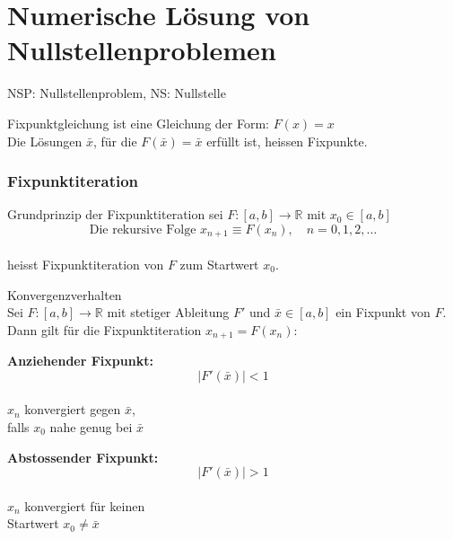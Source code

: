 \section{Numerische Lösung von Nullstellenproblemen}

\begin{remark}
    NSP: Nullstellenproblem, NS: Nullstelle
\end{remark}

\begin{definition}{Fixpunktgleichung}
ist eine Gleichung der Form: $F(x)=x$\\
Die Lösungen $\bar{x}$, für die $F(\bar{x})=\bar{x}$ erfüllt ist, heissen Fixpunkte.
\end{definition}

\subsubsection{Fixpunktiteration}

\begin{concept}{Grundprinzip der Fixpunktiteration}
sei $F:[a,b] \rightarrow \mathbb{R}$ mit $x_0 \in [a,b]$ 
\vspace{-6mm}\\
$$\text{Die rekursive Folge }x_{n+1} \equiv F(x_n), \quad n=0,1,2,\ldots$$
\vspace{-4mm}\\
heisst Fixpunktiteration von $F$ zum Startwert $x_0$.
\end{concept}

\begin{theorem}{Konvergenzverhalten}\\
Sei $F:[a,b] \rightarrow \mathbb{R}$ mit stetiger Ableitung $F'$ und $\bar{x} \in [a,b]$ ein Fixpunkt von $F$. Dann gilt für die Fixpunktiteration $x_{n+1}=F(x_n)$:
\vspace{1mm}\\
\begin{minipage}[t]{0.45\textwidth}
    \textbf{Anziehender Fixpunkt:}
    \vspace{-3mm}\\
    $$|F'(\bar{x})| < 1$$
    \vspace{-4mm}\\
    $x_n$ konvergiert gegen $\bar{x}$,\\
    falls $x_0$ nahe genug bei $\bar{x}$
\end{minipage}
\hspace{3mm}
\begin{minipage}[t]{0.45\textwidth}
    \textbf{Abstossender Fixpunkt:}
    \vspace{-3mm}\\
    $$|F'(\bar{x})| > 1$$
    \vspace{-4mm}\\
    $x_n$ konvergiert für keinen\\
    Startwert $x_0 \neq \bar{x}$
\end{minipage}
\end{theorem}

